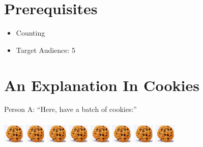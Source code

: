 \documentclass[12pt]{article}
\begin{document}
\maketitle

\section{Prerequisites}
\begin{itemize}
\item Counting
\item Target Audience: 5
\end{itemize}

\section{An Explanation In Cookies}
Person A: ``Here, have a batch of cookies:''\\
\\
\includegraphics[height=10mm, width=10mm]{cookie.jpg}
\includegraphics[height=10mm, width=10mm]{cookie.jpg}
\includegraphics[height=10mm, width=10mm]{cookie.jpg}
\includegraphics[height=10mm, width=10mm]{cookie.jpg}
\includegraphics[height=10mm, width=10mm]{cookie.jpg}
\includegraphics[height=10mm, width=10mm]{cookie.jpg}
\includegraphics[height=10mm, width=10mm]{cookie.jpg}
\includegraphics[height=10mm, width=10mm]{cookie.jpg}
\end{document}
